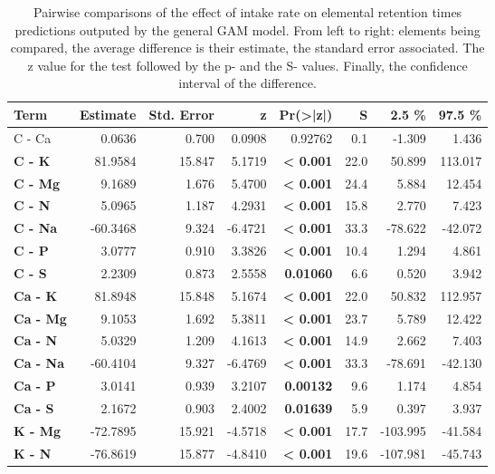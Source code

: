 \begin{table}[H]
\centering
\caption{\label{tab:table_pairs_d_rt}Pairwise comparisons of the effect of intake rate on elemental retention times predictions outputed by the general GAM model. From left to right: elements being compared, the average difference is their estimate, the standard error associated. The z value for the test followed by the p- and the S- values. Finally, the confidence interval of the difference.}
\centering
\begin{tabular}[t]{>{}lrrr>{}rrrr}
\toprule
\textbf{Term} & \textbf{Estimate} & \textbf{Std. Error} & \textbf{z} & \textbf{Pr(>|z|)} & \textbf{S} & \textbf{2.5 \%} & \textbf{97.5 \%}\\
\midrule
C - Ca & 0.0636 & 0.700 & 0.0908 & 0.92762 & 0.1 & -1.309 & 1.436\\
\textbf{C - K} & 81.9584 & 15.847 & 5.1719 & \textbf{< 0.001} & 22.0 & 50.899 & 113.017\\
\textbf{C - Mg} & 9.1689 & 1.676 & 5.4700 & \textbf{< 0.001} & 24.4 & 5.884 & 12.454\\
\textbf{C - N} & 5.0965 & 1.187 & 4.2931 & \textbf{< 0.001} & 15.8 & 2.770 & 7.423\\
\textbf{C - Na} & -60.3468 & 9.324 & -6.4721 & \textbf{< 0.001} & 33.3 & -78.622 & -42.072\\
\textbf{C - P} & 3.0777 & 0.910 & 3.3826 & \textbf{< 0.001} & 10.4 & 1.294 & 4.861\\
\textbf{C - S} & 2.2309 & 0.873 & 2.5558 & \textbf{0.01060} & 6.6 & 0.520 & 3.942\\
\textbf{Ca - K} & 81.8948 & 15.848 & 5.1674 & \textbf{< 0.001} & 22.0 & 50.832 & 112.957\\
\textbf{Ca - Mg} & 9.1053 & 1.692 & 5.3811 & \textbf{< 0.001} & 23.7 & 5.789 & 12.422\\
\textbf{Ca - N} & 5.0329 & 1.209 & 4.1613 & \textbf{< 0.001} & 14.9 & 2.662 & 7.403\\
\textbf{Ca - Na} & -60.4104 & 9.327 & -6.4769 & \textbf{< 0.001} & 33.3 & -78.691 & -42.130\\
\textbf{Ca - P} & 3.0141 & 0.939 & 3.2107 & \textbf{0.00132} & 9.6 & 1.174 & 4.854\\
\textbf{Ca - S} & 2.1672 & 0.903 & 2.4002 & \textbf{0.01639} & 5.9 & 0.397 & 3.937\\
\textbf{K - Mg} & -72.7895 & 15.921 & -4.5718 & \textbf{< 0.001} & 17.7 & -103.995 & -41.584\\
\textbf{K - N} & -76.8619 & 15.877 & -4.8410 & \textbf{< 0.001} & 19.6 & -107.981 & -45.743\\

\end{tabular}
\end{table}
